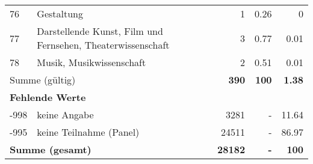 \begin{longtable}{lXrrr}
        76 & \multicolumn{1}{X}{Gestaltung} & %
          \num{1} &
          \num[round-mode=places,round-precision=2]{0.26} &
          \num[round-mode=places,round-precision=2]{0} \\

        77 & \multicolumn{1}{X}{Darstellende Kunst, Film und Fernsehen, Theaterwissenschaft} & %
          \num{3} &
          \num[round-mode=places,round-precision=2]{0.77} &
          \num[round-mode=places,round-precision=2]{0.01} \\

        78 & \multicolumn{1}{X}{Musik, Musikwissenschaft} & %
          \num{2} &
          \num[round-mode=places,round-precision=2]{0.51} &
          \num[round-mode=places,round-precision=2]{0.01} \\

     \midrule
     \multicolumn{2}{l}{Summe (gültig)} &
       \textbf{\num{390}} &
     \textbf{\num{100}} &
       \textbf{\num[round-mode=places,round-precision=2]{1.38}} \\
     \multicolumn{5}{l}{\textbf{Fehlende Werte}}\\
       -998 &
       keine Angabe &
         \num{3281} &
        - &
         \num[round-mode=places,round-precision=2]{11.64} \\
       -995 &
       keine Teilnahme (Panel) &
         \num{24511} &
        - &
         \num[round-mode=places,round-precision=2]{86.97} \\
     \midrule
     \multicolumn{2}{l}{\textbf{Summe (gesamt)}} &
          \textbf{\num{28182}} &
        \textbf{-} &
        \textbf{\num{100}} \\
     \bottomrule
     \end{longtable}
     
